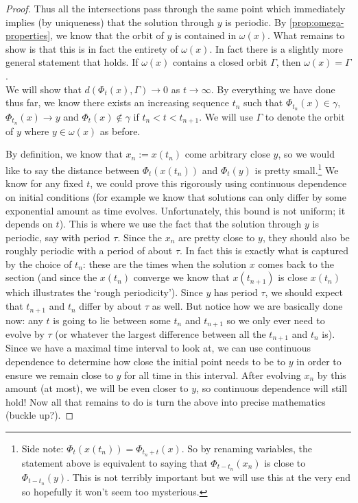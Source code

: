 \begin{proof}
Thus all the intersections pass through the same point which immediately implies (by uniqueness) that the solution through $y$ is periodic. By \autoref{prop:omega-properties}, we know that the orbit of $y$ is contained in $\omega(x)$. What remains to show is that this is in fact the entirety of $\omega(x)$. In fact there is a slightly more general statement that holds. If $\omega(x)$ contains a closed orbit $\Gamma$, then $\omega(x) = \Gamma$.\\

We will show that $d(\Phi_t(x), \Gamma) \to 0$ as $t \to \infty$. 
By everything we have done thus far, we know there exists an increasing sequence $t_n$ such that $\Phi_{t_n}(x) \in \gamma$, $\Phi_{t_n}(x) \to y$ and $\Phi_{t}(x) \notin \gamma$ if $t_{n} < t < t_{n + 1}$. We will use $\Gamma$ to denote the orbit of $y$ where $y \in \omega(x)$ as before.

By definition, we know that $x_n := x(t_n)$ come arbitrary close $y$, so we would like to say the distance between $\Phi_t(x(t_n))$ and $\Phi_t(y)$ is pretty small.\footnote{Side note: $\Phi_t(x(t_n)) = \Phi_{t_n + t}(x)$. So by renaming variables, the statement above is equivalent to saying that $\Phi_{t - t_n}(x_n)$ is close to $\Phi_{t- t_n}(y)$. This is not terribly important but we will use this at the very end so hopefully it won't seem too mysterious. } We know for any fixed $t$, we could prove this rigorously using continuous dependence on initial conditions (for example we know that solutions can only differ by some exponential amount as time evolves. Unfortunately, this bound is not uniform; it depends on $t$). This is where we use the fact that the solution through $y$ is periodic, say with period $\tau$. Since the $x_n$ are pretty close to $y$, they should also be roughly periodic with a period of about $\tau$. In fact this is exactly what is captured by the choice of $t_n$: these are the times when the solution $x$ comes back to the section (and since the $x(t_n)$ converge we know that $x(t_{n + 1})$ is close $x(t_{n})$ which illustrates the `rough periodicity'). Since $y$ has period $\tau$, we should expect that $t_{n + 1}$ and $t_{n}$ differ by about $\tau$ as well. But notice how we are basically done now: any $t$ is going to lie between some $t_n$ and $t_{n + 1}$ so we only ever need to evolve by $\tau$ (or whatever the largest difference between all the $t_{n + 1}$ and $t_n$ is). Since we have a maximal time interval to look at, we can use continuous dependence to determine how close the initial point needs to be to $y$ in order to ensure we remain close to $y$ for all time in this interval. After evolving $x_n$ by this amount (at most), we will be even closer to $y$, so continuous dependence will still hold! Now all that remains to do is turn the above into precise mathematics (buckle up?).


\end{proof}
